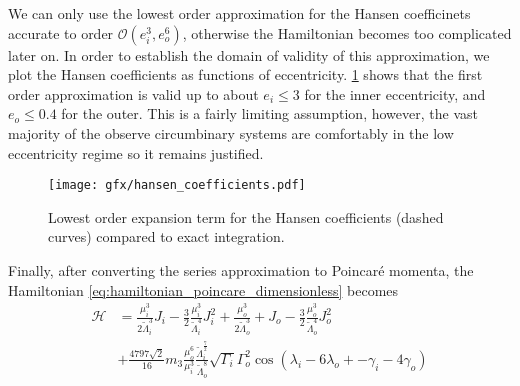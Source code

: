 We can only use the lowest order approximation for the Hansen coefficinets
accurate to order 
$\mathcal{O}(e_i^3,e_o^6)$, otherwise the Hamiltonian becomes too complicated
later on. In order to establish the domain of validity of this approximation,
we plot the Hansen coefficients as functions of eccentricity.
\cref{fig:hansen_coefficients} shows that the first order approximation is 
valid up to about $e_i\leq 3$ for the inner eccentricity, and $e_o\leq 0.4$
for the outer. This is a fairly limiting assumption, however, the vast majority
of the observe circumbinary systems are comfortably in the low eccentricity
regime so it remains justified.
\begin{figure}[htb]
\centering
\texttt{[image: gfx/hansen\_coefficients.pdf]}
    \caption{Lowest order expansion term for the Hansen coefficients (dashed curves) 
    compared to exact integration.}
\label{fig:hansen_coefficients}
\end{figure}
Finally, after converting the series approximation to Poincaré momenta, the 
Hamiltonian \ref{eq:hamiltonian_poincare_dimensionless} becomes
\begin{equation}
    \begin{aligned}
        \mathcal{H}&=\frac{\mu_i^3}{2\tilde{\Lambda}_i^3}
        J_i - \frac{3}{2}
        \frac{\mu_i^3}{\tilde{\Lambda}_i^4} J_i^2+
    \frac{\mu_o^3}{2\tilde{\Lambda}_o^3}+
        J_o - \frac{3}{2}
        \frac{\mu_o^3}{\tilde{\Lambda}_o^4} J_o^2\\
        &+\frac{4797\sqrt{2}}{16}m_3 \frac{\mu_o^6}{\mu_i^3} 
        \frac{\tilde{\Lambda}_i^{ \frac{7}{2} }}
        {\tilde{\Lambda}_o^8}\sqrt{\Gamma_i}\Gamma_o^2
    \cos(\lambda_i-6\lambda_o+
    -\gamma_i - 4\gamma_o)
    \end{aligned}
    \label{eq:hamiltonian_poincare_dimensionless_expand}
\end{equation}

